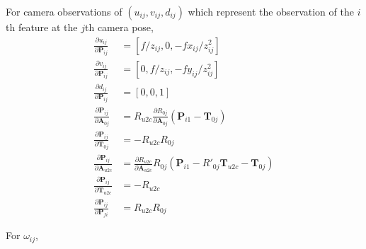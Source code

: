 \documentclass[12pt]{article}   %
\begin{document}
For camera observations of $(u_{ij}, v_{ij}, d_{ij})$ which represent the observation of the $i$th feature at the $j$th camera pose, 
\begin{align}
\frac{\partial u_{ij}}{\partial \textbf{P}_{ij}} &= [f/z_{ij}, 0, -fx_{ij}/z^2_{ij}] \\
\frac{\partial v_{ij}}{\partial \textbf{P}_{ij}} &= [0, f/z_{ij}, -fy_{ij}/z^2_{ij}] \\
\frac{\partial d_{ij}}{\partial \textbf{P}_{ij}} &= [0, 0, 1] \\
\frac{\partial \textbf{P}_{ij}}{\partial \textbf{A}_{0j}} &= R_{u2c} \frac{\partial R_{0j}}{\partial \textbf{A}_{0j}} (\textbf{P}_{i1} - \textbf{T}_{0j}) \\
\frac{\partial \textbf{P}_{ij}}{\partial \textbf{T}_{0j}} &= -R_{u2c} R_{0j} \\
\frac{\partial \textbf{P}_{ij}}{\partial \textbf{A}_{u2c}} &= \frac{\partial R_{u2c}}{\partial \textbf{A}_{u2c}} R_{0j}(\textbf{P}_{i1} - R'_{0j} \textbf{T}_{u2c} - \textbf{T}_{0j}) \\
\frac{\partial \textbf{P}_{ij}}{\partial \textbf{T}_{u2c}} &= -R_{u2c}\\
\frac{\partial \textbf{P}_{ij}}{\partial \textbf{P}_{fi}} &= R_{u2c} R_{0j} 
\end{align}

For $\omega_{ij}$,
\end{document}
